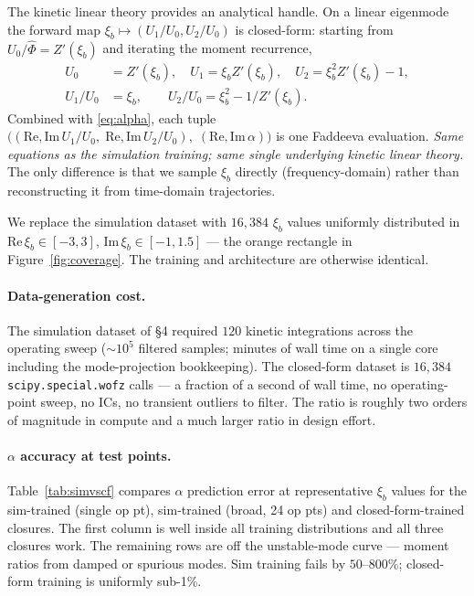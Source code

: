 \documentclass[11pt]{article}
\newcommand{\xib}{\xi_b}
\begin{document}
The kinetic linear theory provides an analytical handle. On a linear
eigenmode the forward map $\xib \mapsto (U_1/U_0, U_2/U_0)$ is closed-form:
starting from $U_0/\hat\Phi = Z'(\xib)$ and iterating the moment
recurrence,
\begin{align}\label{eq:ratios}
  U_0 &= Z'(\xib), \quad U_1 = \xib Z'(\xib), \quad U_2 = \xib^2 Z'(\xib) - 1,\\
  U_1/U_0 &= \xib, \qquad U_2/U_0 = \xib^2 - 1/Z'(\xib).
\end{align}
Combined with \eqref{eq:alpha}, each tuple
$\bigl((\mathrm{Re},\mathrm{Im}\,U_1/U_0,\; \mathrm{Re},\mathrm{Im}\,U_2/U_0),\;
(\mathrm{Re},\mathrm{Im}\,\alpha)\bigr)$
is one Faddeeva evaluation. \emph{Same equations as the simulation
training; same single underlying kinetic linear theory.} The only
difference is that we sample $\xib$ directly (frequency-domain) rather
than reconstructing it from time-domain trajectories.

We replace the simulation dataset with $16{,}384$ $\xib$ values uniformly
distributed in $\mathrm{Re}\,\xib \in [-3,3]$, $\mathrm{Im}\,\xib \in
[-1, 1.5]$ --- the orange rectangle in Figure~\ref{fig:coverage}. The
training and architecture are otherwise identical.

\paragraph{Data-generation cost.} The simulation dataset of \S4 required
$120$ kinetic integrations across the operating sweep ($\sim 10^5$ filtered
samples; minutes of wall time on a single core including the mode-projection
bookkeeping). The closed-form dataset is $16{,}384$ \texttt{scipy.special.wofz}
calls --- a fraction of a second of wall time, no operating-point sweep, no
ICs, no transient outliers to filter. The ratio is roughly two orders of
magnitude in compute and a much larger ratio in design effort.

\paragraph{$\alpha$ accuracy at test points.} Table~\ref{tab:simvscf}
compares $\alpha$ prediction error at representative $\xib$ values for the
sim-trained (single op pt), sim-trained (broad, 24 op pts) and
closed-form-trained closures. The first column is well inside all training
distributions and all three closures work. The remaining rows are off the
unstable-mode curve --- moment ratios from damped or spurious modes.
Sim training fails by $50$--$800\%$; closed-form training is uniformly
sub-1\%.
\end{document}
